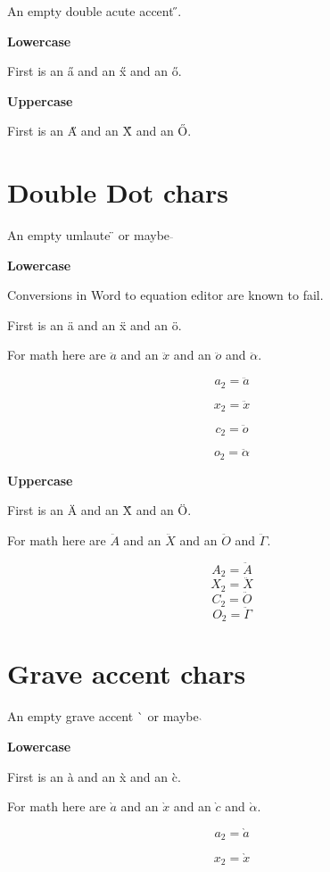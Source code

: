 ﻿\documentclass{article}
\begin{document}
An empty double acute accent \H{}.

\textbf{Lowercase}

First is an \H{a} and an \H{x} and an \H{o}.

\textbf{Uppercase}

First is an \H{A} and an \H{X} and an \H{O}.




\section{Double Dot chars}

An empty umlaute \"{} or maybe $\ddot{}$

\textbf{Lowercase}

Conversions in Word to equation editor are known to fail. 

First is an \"{a} and an \"{x} and an \"{o}.

For math here are $\ddot{a}$ and an $\ddot{x}$ and an $\ddot{o}$ and $\ddot{\alpha}$.

$$a_2=\ddot{a}$$

$$x_2=\ddot{x}$$

$$c_2=\ddot{o}$$

$$o_2=\ddot{\alpha}$$

\textbf{Uppercase}

First is an \"{A} and an \"{X} and an \"{O}.

For math here are $\ddot{A}$ and an $\ddot{X}$ and an $\ddot{O}$ and $\ddot{\Gamma}$.

$$A_2=\ddot{A}$$
$$X_2=\ddot{X}$$
$$C_2=\ddot{O}$$
$$O_2=\ddot{\Gamma}$$




\section{Grave accent chars}

An empty grave accent \`{} or maybe $\grave{}$

\textbf{Lowercase}

First is an \`{a} and an \`{x} and an \`{c}.

For math here are $\grave{a}$ and an $\grave{x}$ and an $\grave{c}$ and $\grave{\alpha}$.

$$a_2=\grave{a}$$

$$x_2=\grave{x}$$
\end{document}
